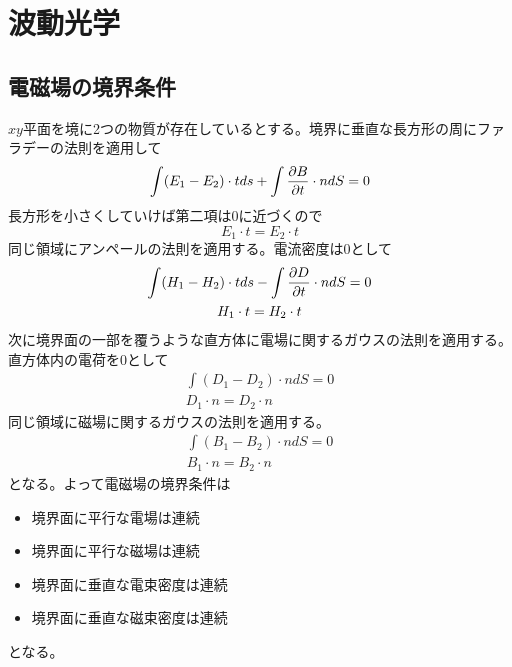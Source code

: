 \section{波動光学}

\subsection{電磁場の境界条件}
    $xy$平面を境に2つの物質が存在しているとする。境界に垂直な長方形の周にファラデーの法則を適用して
        \[\int (E_1 - E_2) \cdot t ds + \int \pdv{B}{t} \cdot n dS = 0\]
    長方形を小さくしていけば第二項は0に近づくので
        \[E_1 \cdot t = E_2 \cdot t\]
    同じ領域にアンペールの法則を適用する。電流密度は0として
    \begin{gather*}
        \int (H_1 - H_2) \cdot t ds - \int \pdv{D}{t} \cdot n dS = 0\\
        H_1 \cdot t = H_2 \cdot t
    \end{gather*}
    次に境界面の一部を覆うような直方体に電場に関するガウスの法則を適用する。直方体内の電荷を0として
    \begin{gather*}
        \int (D_1 - D_2) \cdot n dS = 0\\
        D_1 \cdot n = D_2 \cdot n
    \end{gather*}
    同じ領域に磁場に関するガウスの法則を適用する。
    \begin{gather*}
        \int (B_1 - B_2) \cdot n dS = 0\\
        B_1 \cdot n = B_2 \cdot n
    \end{gather*}
    となる。よって電磁場の境界条件は
    \begin{itemize}
        \item 境界面に平行な電場は連続
        \item 境界面に平行な磁場は連続
        \item 境界面に垂直な電束密度は連続
        \item 境界面に垂直な磁束密度は連続
    \end{itemize}
    となる。


